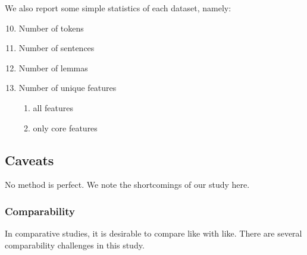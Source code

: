 \documentclass[USenglish]{article}
\begin{document}
We also report some simple statistics of each dataset, namely:

\begin{enumerate}
  \setcounter{enumi}{9}  %
  \item Number of tokens
  \item Number of sentences
  \item Number of lemmas
  \item Number of unique features
      \begin{enumerate}
    \renewcommand{\labelenumi}{\alph{enumi})}
 \item  all features
  \item only core features
 \end{enumerate}
 \end{enumerate}

\subsection{Caveats}
No method is perfect. We note the shortcomings of our study here. 

\subsubsection{Comparability}
\label{caveat_comparability}
In comparative studies, it is desirable to compare like with like. There are several comparability challenges in this study. 
\end{document}
